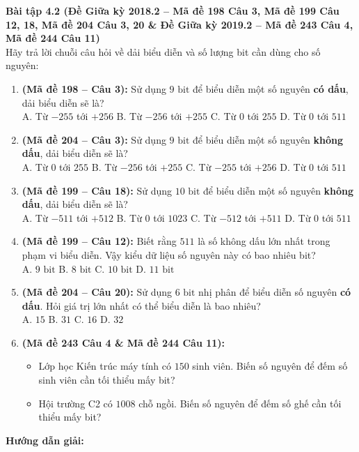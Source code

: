 \textbf{Bài tập 4.2 (Đề Giữa kỳ 2018.2 -- Mã đề 198 Câu 3, Mã đề 199 Câu 12, 18, Mã đề 204 Câu 3, 20 \& Đề Giữa kỳ 2019.2 -- Mã đề 243 Câu 4, Mã đề 244 Câu 11)}\\
Hãy trả lời chuỗi câu hỏi về dải biểu diễn và số lượng bit cần dùng cho số nguyên:
\begin{enumerate}[label=\alph*)]
    \item \textbf{(Mã đề 198 -- Câu 3):} Sử dụng $9\text{ bit}$ để biểu diễn một số nguyên \textbf{có dấu}, dải biểu diễn sẽ là?\\
    A. Từ $-255$ tới $+256$ \quad B. Từ $-256$ tới $+255$ \quad C. Từ $0$ tới $255$ \quad D. Từ $0$ tới $511$
    \item \textbf{(Mã đề 204 -- Câu 3):} Sử dụng $9\text{ bit}$ để biểu diễn một số nguyên \textbf{không dấu}, dải biểu diễn sẽ là?\\
    A. Từ $0$ tới $255$ \quad B. Từ $-256$ tới $+255$ \quad C. Từ $-255$ tới $+256$ \quad D. Từ $0$ tới $511$
    \item \textbf{(Mã đề 199 -- Câu 18):} Sử dụng $10\text{ bit}$ để biểu diễn một số nguyên \textbf{không dấu}, dải biểu diễn sẽ là?\\
    A. Từ $-511$ tới $+512$ \quad B. Từ $0$ tới $1023$ \quad C. Từ $-512$ tới $+511$ \quad D. Từ $0$ tới $511$
    \item \textbf{(Mã đề 199 -- Câu 12):} Biết rằng $511$ là số không dấu lớn nhất trong phạm vi biểu diễn. Vậy kiểu dữ liệu số nguyên này có bao nhiêu bit?\\
    A. $9\text{ bit}$ \quad B. $8\text{ bit}$ \quad C. $10\text{ bit}$ \quad D. $11\text{ bit}$
    \item \textbf{(Mã đề 204 -- Câu 20):} Sử dụng $6\text{ bit}$ nhị phân để biểu diễn số nguyên \textbf{có dấu}. Hỏi giá trị lớn nhất có thể biểu diễn là bao nhiêu?\\
    A. $15$ \quad B. $31$ \quad C. $16$ \quad D. $32$
    \item \textbf{(Mã đề 243 Câu 4 \& Mã đề 244 Câu 11):}
    \begin{itemize}
        \item Lớp học Kiến trúc máy tính có $150$ sinh viên. Biến số nguyên để đếm số sinh viên cần tối thiểu mấy bit?
        \item Hội trường C2 có $1008$ chỗ ngồi. Biến số nguyên để đếm số ghế cần tối thiểu mấy bit?
    \end{itemize}
\end{enumerate}
\textbf{Hướng dẫn giải:}
